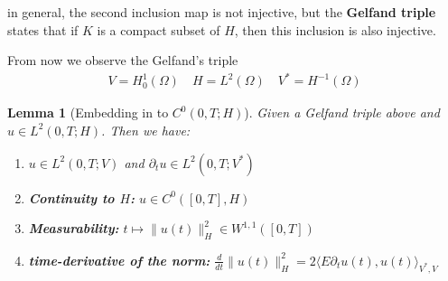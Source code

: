 \documentclass[a4paper,11pt,oneside,fleqn]{book}
\newtheorem{lemma}[theorem]{Lemma}
\theoremstyle{definition}
\theoremstyle{remark}
\begin{document}
 in general, the second inclusion map is not injective, but the \textbf{Gelfand triple} states that if $K$ is a compact subset of $H$, then this inclusion is also injective. \par 
 
 From now we observe the Gelfand's triple
 \begin{align*}
 	V = H_0^1(\Omega) \quad H = L^2(\Omega) \quad V^* = H^{-1}(\Omega)
 \end{align*}
 
 \begin{lemma}[Embedding in to $C^0(0, T; H)$]
 	Given a Gelfand triple above and $u \in L^2(0, T; H)$.  Then we have:
 	\begin{enumerate}
 		\item $u \in L^2(0, T; V)$ and $\partial_t u \in L^2(0, T; V^*)$
 		\item \textbf{Continuity to $H$: }$ u \in C^0([0, T], H)$
 		\item \textbf{Measurability: }$t \mapsto \|u(t)\|_H^2 \in W^{1,1}([0, T])$
 		\item \textbf{time-derivative of the norm: }$\frac{d}{dt} \|u(t)\|_H^2 = 2 \langle E \partial_t u(t), u(t)\rangle_{V^*, V} $
 	\end{enumerate}
 \end{lemma}
\end{document}
